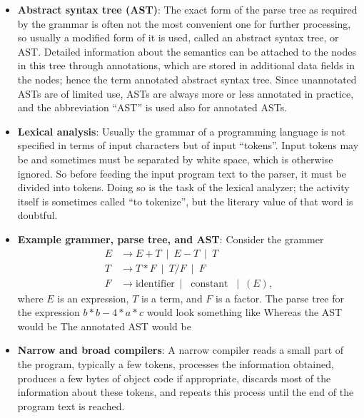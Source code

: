 \documentclass{report}
\begin{document}
\begin{itemize}
        \item \textbf{Abstract syntax tree (AST)}: The exact form of the parse tree as required by the grammar is often not the most convenient one for further processing, so usually a modified form of it is used, called an abstract syntax tree, or AST. Detailed information about the semantics can be attached to the nodes in this tree through annotations, which are stored in additional data fields in the nodes; hence the term annotated abstract syntax tree. Since unannotated ASTs are of limited use, ASTs are always more or less annotated in practice, and the abbreviation “AST” is used also for annotated ASTs.
        \item \textbf{Lexical analysis}: Usually the grammar of a programming language is not specified in terms of input characters but of input “tokens”. Input tokens may be and sometimes must be separated by white space, which is otherwise ignored. So before feeding the input program text to the parser, it must be divided into tokens. Doing so is the task of the lexical analyzer; the activity itself is sometimes called “to tokenize”, but the literary value of that word is doubtful.
        \item \textbf{Example grammer, parse tree, and AST}: Consider the grammer
            \begin{align*}
                E &\to E + T \ \mid \ E - T \ \mid \ T \\
                T &\to T * F\ \mid \ T / F \ \mid \ F \\
                F &\to \text{identifier} \ \mid \ \text{ constant } \ \mid \ (E)
            ,\end{align*}
            where $E$ is an expression, $T$ is a term, and $F$ is a factor. The parse tree for the expression $b*b-4*a*c$ would look something like
            \bigbreak \noindent 
            \bigbreak \noindent 
            Whereas the AST would be 
            \bigbreak \noindent 
            \bigbreak \noindent 
            The annotated AST would be
            \bigbreak \noindent 
        \item \textbf{Narrow and broad compilers}: A narrow compiler reads a small part of the program, typically a few tokens, processes the information obtained, produces a few bytes of object code if appropriate, discards most of the information about these tokens, and repeats this process until the end of the program text is reached.

\end{itemize}
\end{document}
